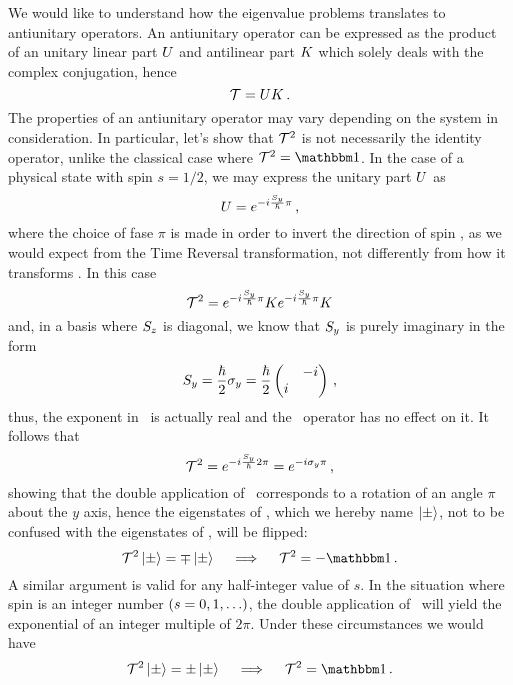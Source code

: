         We would like to understand how the eigenvalue problems translates to antiunitary operators. An antiunitary operator can be expressed \cite{Sakurai2020-pu} as the product of an unitary linear part ${U}$ and antilinear part ${K}$ which solely deals with the complex conjugation, hence
        \begin{equation}
            \label{eq:antiunitary-operator}
            \mathcal{{T}} = {U}{K}
            \,\text{.}
        \end{equation}
        The properties of an antiunitary operator may vary depending on the system in consideration. In particular, let's show that $\mathcal{{T}}^2$ is not necessarily the identity operator, unlike the classical case where $\mcT^2 = \idM$. In the case of a physical state with spin $s = 1/2$, we may express the unitary part ${U}$ as
        \begin{equation*}
            {U} = e^{-i \frac{{S}_y}{\hbar} \pi}
            \,\text{,}
        \end{equation*}
        where the choice of fase $\pi$ is made in order to invert the direction of spin \hvS, as we would expect from the Time Reversal transformation, not differently from how it transforms \hvp. In this case
        \begin{equation*}
            \mathcal{{T}}^2 = e^{-i \frac{{S}_y}{\hbar} \pi} {K} e^{-i \frac{{S}_y}{\hbar} \pi} {K}
        \end{equation*}
        and, in a basis where ${S}_z$ is diagonal, we know that ${S}_y$ is purely imaginary in  the form
        \begin{equation*}
            \hSy
            = \frac{\hbar}{2} \togglehat{\sigma}_y
            = \frac{\hbar}{2} \pmqty{\admat{-i,i}}
            \mycomma
        \end{equation*}
        thus, the exponent in \hU\ is actually real and the \hK\ operator has no effect on it. It follows that
        \begin{equation*}
            \mathcal{{T}}^2
            = e^{-i \frac{{S}_y}{\hbar} 2\pi}
            = e^{-i {\sigma}_y \pi}
            \,\text{,}
        \end{equation*}
        showing that the double application of \hT\ corresponds to a rotation of an angle $\pi$ about the $y$ axis, hence the eigenstates of \hSz, which we hereby name $\ket{\pm}$, not to be confused with the eigenstates of \hP, will be flipped:
        \begin{equation*}
            \hT^2 \ket{\pm} = \mp \ket{\pm}
            \quad\implies\quad
            \hT^2 = -\togglehat{\idM}
            \myperiod
        \end{equation*}
        A similar argument is valid for any half-integer value of $s$. In the situation where spin is an integer number $\pqty{s = 0,1,\ldots}$, the double application of \hK\ will yield the exponential of an integer multiple of $2\pi$. Under these circumstances we would have
        \begin{equation*}
            \hT^2 \ket{\pm} = \pm\ket{\pm}
            \quad\implies\quad
            \hT^2 = \togglehat{\idM}
            \myperiod
        \end{equation*}

